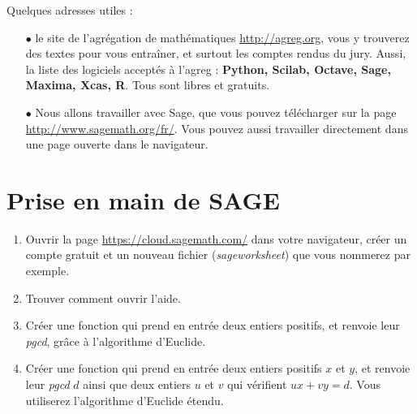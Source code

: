 Quelques adresses utiles :
\begin{itemize}
\item[$\bullet$]le site de l'agrégation de mathématiques \url{http://agreg.org}, vous y trouverez des textes pour vous entraîner, et surtout les comptes rendus du jury. Aussi, la liste des logiciels acceptés à l'agreg : \textbf{Python, Scilab, Octave, Sage, Maxima, Xcas, R}. Tous sont libres et gratuits.
\item[$\bullet$]Nous allons travailler avec Sage, que vous pouvez télécharger sur la page \url{http://www.sagemath.org/fr/}. Vous pouvez aussi travailler directement dans une page ouverte dans le navigateur.
\end{itemize}

\section{Prise en main de SAGE}

\begin{enumerate}
\item Ouvrir la page \url{https://cloud.sagemath.com/} dans votre navigateur, créer un compte gratuit et un nouveau fichier (\textit{sageworksheet}) que vous nommerez  par exemple.
\item Trouver comment ouvrir l'aide.
\item Créer une fonction qui prend en entrée deux entiers positifs, et renvoie leur \textit{pgcd}, grâce à l'algorithme d'Euclide.
\item Créer une fonction qui prend en entrée deux entiers positifs $x$ et $y$, et renvoie leur \textit{pgcd} $d$ ainsi que deux entiers $u$ et $v$ qui vérifient $ux+vy=d$. Vous utiliserez l'algorithme d'Euclide étendu.

\end{enumerate}